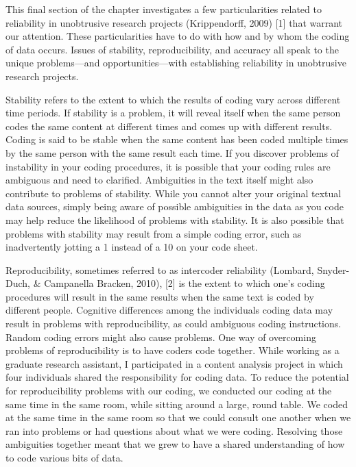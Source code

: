 This final section of the chapter investigates a few particularities related to reliability in unobtrusive research projects (Krippendorff, 2009) [1] that warrant our attention. These particularities have to do with how and by whom the coding of data occurs. Issues of stability, reproducibility, and accuracy all speak to the unique problems—and opportunities—with establishing reliability in unobtrusive research projects.

Stability refers to the extent to which the results of coding vary across different time periods. If stability is a problem, it will reveal itself when the same person codes the same content at different times and comes up with different results. Coding is said to be stable when the same content has been coded multiple times by the same person with the same result each time. If you discover problems of instability in your coding procedures, it is possible that your coding rules are ambiguous and need to clarified. Ambiguities in the text itself might also contribute to problems of stability. While you cannot alter your original textual data sources, simply being aware of possible ambiguities in the data as you code may help reduce the likelihood of problems with stability. It is also possible that problems with stability may result from a simple coding error, such as inadvertently jotting a 1 instead of a 10 on your code sheet.

Reproducibility, sometimes referred to as intercoder reliability (Lombard, Snyder-Duch, \& Campanella Bracken, 2010), [2] is the extent to which one’s coding procedures will result in the same results when the same text is coded by different people. Cognitive differences among the individuals coding data may result in problems with reproducibility, as could ambiguous coding instructions. Random coding errors might also cause problems. One way of overcoming problems of reproducibility is to have coders code together. While working as a graduate research assistant, I participated in a content analysis project in which four individuals shared the responsibility for coding data. To reduce the potential for reproducibility problems with our coding, we conducted our coding at the same time in the same room, while sitting around a large, round table. We coded at the same time in the same room so that we could consult one another when we ran into problems or had questions about what we were coding. Resolving those ambiguities together meant that we grew to have a shared understanding of how to code various bits of data.


